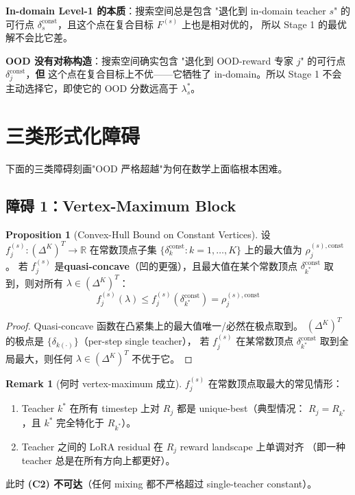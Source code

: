 \documentclass[11pt,a4paper]{article}
\newcommand{\R}{\mathbb{R}}
\newcommand{\const}{\mathrm{const}}
\theoremstyle{definition}
\newtheorem{remark}{Remark}
\newtheorem{proposition}{Proposition}
\begin{document}
\begin{tcolorbox}[colback=blue!5,colframe=blue!50!black,title=核心不对称性]
\textbf{In-domain Level-1 的本质}：搜索空间总是包含 "退化到 in-domain teacher
$s$" 的可行点 $\delta_s^\const$，且这个点在复合目标 $F^{(s)}$ 上也是相对优的，
所以 Stage 1 的最优解不会比它差。

\textbf{OOD 没有对称构造}：搜索空间确实包含 "退化到 OOD-reward 专家 $j$"
的可行点 $\delta_j^\const$，\textbf{但} 这个点在复合目标上不优——它牺牲了
in-domain。所以 Stage 1 不会主动选择它，即使它的 OOD 分数远高于 $\lambda_s^*$。
\end{tcolorbox}

\section{三类形式化障碍}
\label{sec:obstructions}

下面的三类障碍刻画"OOD 严格超越"为何在数学上面临根本困难。

\subsection{障碍 1：Vertex-Maximum Block}

\begin{proposition}[Convex-Hull Bound on Constant Vertices]
\label{prop:vertex_block}
设 $f_j^{(s)}: (\Delta^K)^T \to \R$ 在常数顶点子集
$\{\delta_k^\const : k = 1, \ldots, K\}$ 上的最大值为 $\rho_j^{(s),\const}$。
若 $f_j^{(s)}$ 是\textbf{quasi-concave}（凹的更强），且最大值在某个常数顶点
$\delta_{k^*}^\const$ 取到，则对所有 $\lambda \in (\Delta^K)^T$：
\begin{equation}
f_j^{(s)}(\lambda) \leq f_j^{(s)}(\delta_{k^*}^\const) = \rho_j^{(s),\const}
\end{equation}
\end{proposition}

\begin{proof}
Quasi-concave 函数在凸紧集上的最大值唯一/必然在极点取到。
$(\Delta^K)^T$ 的极点是 $\{\delta_{k(\cdot)}\}$（per-step single teacher），
若 $f_j^{(s)}$ 在某常数顶点 $\delta_{k^*}^\const$ 取到全局最大，则任何
$\lambda \in (\Delta^K)^T$ 不优于它。
\end{proof}

\begin{remark}[何时 vertex-maximum 成立]
$f_j^{(s)}$ 在常数顶点取最大的常见情形：
\begin{enumerate}[leftmargin=1.5em]
\item Teacher $k^*$ 在所有 timestep 上对 $R_j$ 都是 unique-best（典型情况：
$R_j = R_{k^*}$，且 $k^*$ 完全特化于 $R_{k^*}$）。
\item Teacher 之间的 LoRA residual 在 $R_j$ reward landscape 上单调对齐
（即一种 teacher 总是在所有方向上都更好）。
\end{enumerate}
此时 \textbf{(C2) 不可达}（任何 mixing 都不严格超过 single-teacher constant）。
\end{remark}
\end{document}
